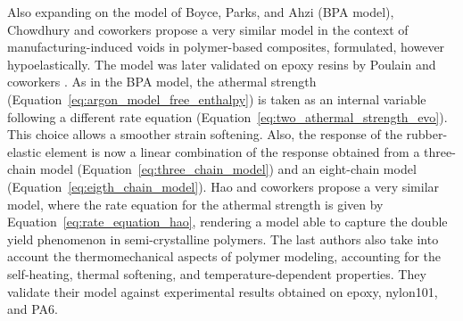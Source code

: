 Also expanding on the model of Boyce, Parks, and Ahzi \citep{boyceLargeInelasticDeformation1988} (BPA model), Chowdhury and coworkers \citep{chowdhuryEffectsManufacturingInducedVoids2008} propose a very similar model in the context of manufacturing-induced voids in polymer-based composites, formulated, however hypoelastically.
The model was later validated on epoxy resins by Poulain and coworkers \citep{poulainFinitestrainElastoviscoplasticBehavior2014}.
As in the BPA model, the athermal strength (Equation~\eqref{eq:argon_model_free_enthalpy}) is taken as an internal variable following a different rate equation (Equation~\eqref{eq:two_athermal_strength_evo}).
This choice allows a smoother strain softening.
Also, the response of the rubber-elastic element is now a linear combination of the response obtained from a three-chain model (Equation~\eqref{eq:three_chain_model}) and an eight-chain model (Equation~\eqref{eq:eigth_chain_model}).
Hao and coworkers \citep{haoUnifiedAmorphousCrystalline2022} propose a very similar model, where the rate equation for the athermal strength is given by Equation~\eqref{eq:rate_equation_hao}, rendering a model able to capture the double yield phenomenon in semi-crystalline polymers.
The last authors also take into account the thermomechanical aspects of polymer modeling, accounting for the self-heating, thermal softening, and temperature-dependent properties.
They validate their model against experimental results obtained on epoxy, nylon101, and PA6.

